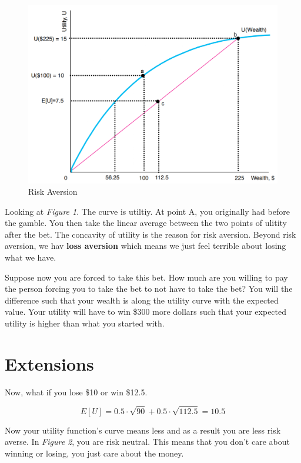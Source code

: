 \documentclass{article}
\begin{document}
\begin{figure}[H]
    \centering
    \includegraphics[scale=0.60]{"Risk Aversion"}
    \caption{Risk Aversion}
\end{figure}

Looking at \textit{Figure 1}. The curve is utiltiy. At point A, you originally
had before the gamble. You then take the linear average between the two points
of ulitity after the bet. The concavity of utility is the reason for risk
aversion. Beyond risk aversion, we hav \textbf{loss aversion} which means we
just feel terrible about losing what we have.

Suppose now you are forced to take this bet. How much are you willing to pay the
person forcing you to take the bet to not have to take the bet? You will the
difference such that your wealth is along the utility curve with the expected
value. Your utility will have to win \$300 more dollars such that your expected
utility is higher than what you started with.

\section{Extensions}

Now, what if you lose \$10 or win \$12.5. 

$$E[U] = 0.5 \cdot \sqrt{90} + 0.5 \cdot \sqrt{112.5} = 10.5$$

Now your utility function's curve means less and as a result you are less risk
averse. In \textit{Figure 2}, you are risk neutral. This means that you don't
care about winning or losing, you just care about the money. 
\end{document}
